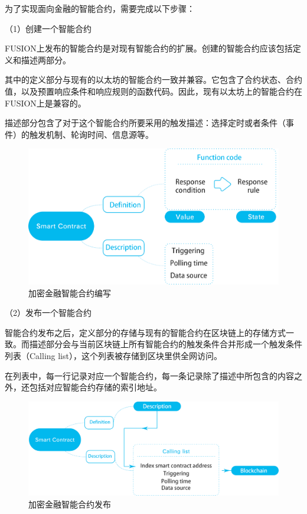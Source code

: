 \documentclass[a4paper,12pt]{article}
\begin{document}
为了实现面向金融的智能合约，需要完成以下步骤：

（1）创建一个智能合约

FUSION上发布的智能合约是对现有智能合约的扩展。创建的智能合约应该包括定义和描述两部分。

其中的定义部分与现有的以太坊的智能合约一致并兼容。它包含了合约状态、合约值，以及预置响应条件和响应规则的函数代码。因此，现有以太坊上的智能合约在FUSION上是兼容的。

描述部分包含了对于这个智能合约所要采用的触发描述：选择定时或者条件（事件）的触发机制、轮询时间、信息源等。

\begin{figure}[htbp]
\centering\includegraphics[width=5in]{pic/CFSC.png}
\caption{加密金融智能合约编写}\label{fig:1}
\end{figure}

（2）发布一个智能合约

智能合约发布之后，定义部分的存储与现有的智能合约在区块链上的存储方式一致。而描述部分会与当前区块链上所有智能合约的触发条件合并形成一个触发条件列表（Calling list），这个列表被存储到区块里供全网访问。

在列表中，每一行记录对应一个智能合约，每一条记录除了描述中所包含的内容之外，还包括对应智能合约存储的索引地址。


\begin{figure}[htbp]
\centering\includegraphics[width=5in]{pic/CFSCre.png}
\caption{加密金融智能合约发布}\label{fig:1}
\end{figure}
\end{document}
